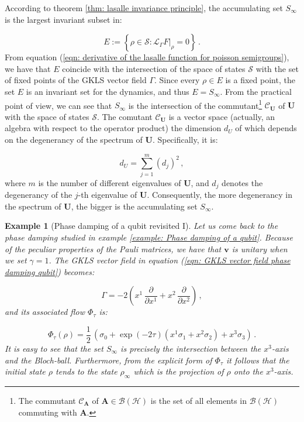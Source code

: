 \documentclass[11pt]{article}
\newcommand{\be}{\begin{equation}}
\newcommand{\ee}{\end{equation}}
\newcommand{\stsp}{\mathcal{S}}
\newtheorem{exmp}{Example}
\begin{document}
According to theorem \ref{thm: lasalle invariance principle}, the accumulating set $S_{\infty}$ is the largest invariant subset in:

\be
E:=\left\{\rho\in\stsp\colon \left.\mathcal{L}_{\Gamma}F\right|_{\rho}=0\right\}\,.
\ee
From equation (\ref{eqn: derivative of the lasalle function for poisson semigroups}), 
we have that $E$ coincide with the intersection of the space of states $\stsp$ with the set of fixed points of the GKLS vector field $\Gamma$.
Since every $\rho\in E$ is a fixed point, the set $E$ is an invariant set for the dynamics, and thus $E=S_{\infty}$.
From the practical point of view, we can see that $S_{\infty}$   is the intersection of the commutant\footnote{The commutant $\mathcal{C}_{\mathbf{A}}$ of $\mathbf{A}\in\mathcal{B}(\mathcal{H})$ is the set of all elements in $\mathcal{B}(\mathcal{H})$ commuting with $\mathbf{A}$.} $\mathcal{C}_{\mathbf{U}}$ of $\mathbf{U}$ with the space of states $\stsp$.
The comutant $\mathcal{C}_{\mathbf{U}}$ is a vector space (actually, an algebra with respect to the operator product) the dimension $d_{U}$ of which depends on the degenerancy of the spectrum of $\mathbf{U}$.
Specifically, it is:

\be
d_{U}=\sum_{j=1}^{m}(d_{j})^{2}\,,
\ee
where $m$ is the number of different eigenvalues of $\mathbf{U}$, and $d_{j}$ denotes the  degenerancy of the $j$-th eigenvalue of $\mathbf{U}$.
Consequently, the more degenerancy in the spectrum of $\mathbf{U}$, the bigger is the accumulating set $S_{\infty}$.


\begin{exmp}[Phase damping of a qubit revisited I]\label{example: Phase damping of a qubit revisited I}
Let us come back to the phase damping studied in example \ref{example: Phase damping of a qubit}.
Because of the peculiar properties of the Pauli matrices, we have that $\mathbf{v}$ is unitary when we set $\gamma=1$.
The GKLS vector field in equation (\ref{eqn: GKLS vector field phase damping qubit}) becomes:

\be
\Gamma = -2\left(x^{1}\,\frac{\partial}{\partial x^{1}} + x^{2}\,\frac{\partial}{\partial x^{2}}\right)\,, 
\ee
and its associated flow $\Phi_{\tau}$ is:

\be
\Phi_{\tau}(\rho)=\frac{1}{2}\,\left(\sigma_{0} + \exp(- 2\tau)\left(x^{1}\sigma_{1} + x^{2}\sigma_{2}\right) + x^{3}\sigma_{3}\right)\,.
\ee
It is easy to see that the set $S_{\infty}$ is precisely the intersection between the $x^{3}$-axis and the Bloch-ball.
Furthermore, from the explicit form of $\Phi_{\tau}$ it follows that the initial state $\rho$ tends to the state $\rho_{\infty}$ which is the projection of $\rho$ onto the $x^{3}$-axis.
\end{exmp}
\end{document}
